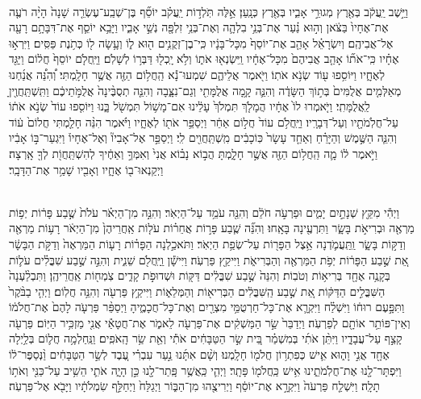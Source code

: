 \documentclass[twoside, openany, parskip=half, 11pt]{book}
\begin{document}
\begin{footnotesize}
\begin{multicols}{2}
\\
 וַיֵּ֣שֶׁב יַֽעֲקֹ֔ב בְּאֶ֖רֶץ מְגוּרֵ֣י אָבִ֑יו בְּאֶ֖רֶץ כְּנָֽעַן׃ אֵ֣לֶּה תֹּֽלְד֣וֹת יַֽעֲקֹ֗ב יוֹסֵ֞ף בֶּן־שְׁבַֽע־עֶשְׂרֵ֤ה שָׁנָה֙ הָיָ֨ה רֹעֶ֤ה אֶת־אֶחָיו֙ בַּצֹּ֔אן וְה֣וּא נַ֗עַר אֶת־בְּנֵ֥י בִלְהָ֛ה וְאֶת־בְּנֵ֥י זִלְפָּ֖ה נְשֵׁ֣י אָבִ֑יו וַיָּבֵ֥א יוֹסֵ֛ף אֶת־דִּבָּתָ֥ם רָעָ֖ה אֶל־אֲבִיהֶֽם׃ וְיִשְׂרָאֵ֗ל אָהַ֤ב אֶת־יוֹסֵף֙ מִכָּל־בָּנָ֔יו כִּֽי־בֶן־זְקֻנִ֥ים ה֖וּא ל֑וֹ וְעָ֥שָׂה ל֖וֹ כְּתֹ֥נֶת פַּסִּֽים׃  וַיִּרְא֣וּ אֶחָ֗יו כִּֽי־אֹת֞וֹ אָהַ֤ב אֲבִיהֶם֙ מִכָּל־אֶחָ֔יו וַֽיִּשְׂנְא֖וּ אֹת֑וֹ וְלֹ֥א יָֽכְל֖וּ דַּבְּר֥וֹ לְשָׁלֹֽם׃ וַיַּֽחֲלֹ֤ם יוֹסֵף֙ חֲל֔וֹם וַיַּגֵּ֖ד לְאֶחָ֑יו וַיּוֹסִ֥פוּ ע֖וֹד שְׂנֹ֥א אֹתֽוֹ׃ וַיֹּ֖אמֶר אֲלֵיהֶ֑ם שִׁמְעוּ־נָ֕א הַֽחֲל֥וֹם הַזֶּ֖ה אֲשֶׁ֥ר חָלָֽמְתִּי׃ וְ֠הִנֵּ֠ה אֲנַ֜חְנוּ מְאַלְּמִ֤ים אֲלֻמִּים֙ בְּת֣וֹךְ הַשָּׂדֶ֔ה וְהִנֵּ֛ה קָ֥מָה אֲלֻמָּתִ֖י וְגַם־נִצָּ֑בָה וְהִנֵּ֤ה תְסֻבֶּ֨ינָה֙ אֲלֻמֹּ֣תֵיכֶ֔ם וַתִּֽשְׁתַּֽחֲוֶ֖יןָ לַֽאֲלֻמָּתִֽי׃  וַיֹּ֤אמְרוּ לוֹ֙ אֶחָ֔יו הֲמָלֹ֤ךְ תִּמְלֹךְ֙ עָלֵ֔ינוּ אִם־מָשׁ֥וֹל תִּמְשֹׁ֖ל בָּ֑נוּ וַיּוֹסִ֤פוּ עוֹד֙ שְׂנֹ֣א אֹת֔וֹ עַל־חֲלֹֽמֹתָ֖יו וְעַל־דְּבָרָֽיו׃ וַיַּֽחֲלֹ֥ם עוֹד֙ חֲל֣וֹם אַחֵ֔ר וַיְסַפֵּ֥ר אֹת֖וֹ לְאֶחָ֑יו וַיֹּ֗אמֶר הִנֵּ֨ה חָלַ֤מְתִּי חֲלוֹם֙ ע֔וֹד וְהִנֵּ֧ה הַשֶּׁ֣מֶשׁ וְהַיָּרֵ֗חַ וְאַחַ֤ד עָשָׂר֙ כּֽוֹכָבִ֔ים מִֽשְׁתַּֽחֲוִ֖ים לִֽי׃ וַיְסַפֵּ֣ר אֶל־אָבִיו֘ וְאֶל־אֶחָיו֒ וַיִּגְעַר־בּ֣וֹ אָבִ֔יו וַיֹּ֣אמֶר ל֔וֹ מָ֛ה הַֽחֲל֥וֹם הַזֶּ֖ה אֲשֶׁ֣ר חָלָ֑מְתָּ הֲב֣וֹא נָב֗וֹא אֲנִי֙ וְאִמְּךָ֣ וְאַחֶ֔יךָ לְהִשְׁתַּֽחֲוֹ֖ת לְךָ֖ אָֽרְצָה׃ וַיְקַנְאוּ־ב֖וֹ אֶחָ֑יו וְאָבִ֖יו שָׁמַ֥ר אֶת־הַדָּבָֽר׃

\\
 וַיְהִ֕י מִקֵּ֖ץ שְׁנָתַ֣יִם יָמִ֑ים וּפַרְעֹ֣ה חֹלֵ֔ם וְהִנֵּ֖ה עֹמֵ֥ד עַל־הַיְאֹֽר׃ וְהִנֵּ֣ה מִן־הַיְאֹ֗ר עֹלֹת֙ שֶׁ֣בַע פָּר֔וֹת יְפ֥וֹת מַרְאֶ֖ה וּבְרִיאֹ֣ת בָּשָׂ֑ר וַתִּרְעֶ֖ינָה בָּאָֽחוּ׃ וְהִנֵּ֞ה שֶׁ֧בַע פָּר֣וֹת אֲחֵר֗וֹת עֹל֤וֹת אַֽחֲרֵיהֶן֙ מִן־הַיְאֹ֔ר רָע֥וֹת מַרְאֶ֖ה וְדַקּ֣וֹת בָּשָׂ֑ר וַֽתַּֽעֲמֹ֛דְנָה אֵ֥צֶל הַפָּר֖וֹת עַל־שְׂפַ֥ת הַיְאֹֽר׃ וַתֹּאכַ֣לְנָה הַפָּר֗וֹת רָע֤וֹת הַמַּרְאֶה֙ וְדַקֹּ֣ת הַבָּשָׂ֔ר אֵ֚ת שֶׁ֣בַע הַפָּר֔וֹת יְפֹ֥ת הַמַּרְאֶ֖ה וְהַבְּרִיאֹ֑ת וַיִּיקַ֖ץ פַּרְעֹֽה׃  וַיִּישָׁ֕ן וַֽיַּֽחֲלֹ֖ם שֵׁנִ֑ית וְהִנֵּ֣ה שֶׁ֣בַע שִׁבֳּלִ֗ים עֹל֛וֹת בְּקָנֶ֥ה אֶחָ֖ד בְּרִיא֥וֹת וְטֹבֽוֹת׃ וְהִנֵּה֙ שֶׁ֣בַע שִׁבֳּלִ֔ים דַּקּ֖וֹת וּשְׁדוּפֹ֣ת קָדִ֑ים צֹֽמְח֖וֹת אַֽחֲרֵיהֶֽן׃ וַתִּבְלַ֨עְנָה֙ הַשִּׁבֳּלִ֣ים הַדַּקּ֔וֹת אֵ֚ת שֶׁ֣בַע הַֽשִּׁבֳּלִ֔ים הַבְּרִיא֖וֹת וְהַמְּלֵא֑וֹת וַיִּיקַ֥ץ פַּרְעֹ֖ה וְהִנֵּ֥ה חֲלֽוֹם׃  וַיְהִ֤י בַבֹּ֨קֶר֙ וַתִּפָּ֣עֶם רוּח֔וֹ וַיִּשְׁלַ֗ח וַיִּקְרָ֛א אֶת־כָּל־חַרְטֻמֵּ֥י מִצְרַ֖יִם וְאֶת־כָּל־חֲכָמֶ֑יהָ וַיְסַפֵּ֨ר פַּרְעֹ֤ה לָהֶם֙ אֶת־חֲלֹמ֔וֹ וְאֵין־פּוֹתֵ֥ר אוֹתָ֖ם לְפַרְעֹֽה׃ וַיְדַבֵּר֙ שַׂ֣ר הַמַּשְׁקִ֔ים אֶת־פַּרְעֹ֖ה לֵאמֹ֑ר אֶת־חֲטָאַ֕י אֲנִ֖י מַזְכִּ֥יר הַיּֽוֹם׃ פַּרְעֹ֖ה קָצַ֣ף עַל־עֲבָדָ֑יו וַיִּתֵּ֨ן אֹתִ֜י בְּמִשְׁמַ֗ר בֵּ֚ית שַׂ֣ר הַטַּבָּחִ֔ים אֹתִ֕י וְאֵ֖ת שַׂ֥ר הָֽאֹפִֽים׃ וַנַּֽחַלְמָ֥ה חֲל֛וֹם בְּלַ֥יְלָה אֶחָ֖ד אֲנִ֣י וָה֑וּא אִ֛ישׁ כְּפִתְר֥וֹן חֲלֹמ֖וֹ חָלָֽמְנוּ׃ וְשָׁ֨ם אִתָּ֜נוּ נַ֣עַר עִבְרִ֗י עֶ֚בֶד לְשַׂ֣ר הַטַּבָּחִ֔ים וַ֨נְּסַפֶּר־ל֔וֹ וַיִּפְתָּר־לָ֖נוּ אֶת־חֲלֹֽמֹתֵ֑ינוּ אִ֥ישׁ כַּֽחֲלֹמ֖וֹ פָּתָֽר׃ וַיְהִ֛י כַּֽאֲשֶׁ֥ר פָּֽתַר־לָ֖נוּ כֵּ֣ן הָיָ֑ה אֹתִ֛י הֵשִׁ֥יב עַל־כַּנִּ֖י וְאֹת֥וֹ תָלָֽה׃ וַיִּשְׁלַ֤ח פַּרְעֹה֙ וַיִּקְרָ֣א אֶת־יוֹסֵ֔ף וַיְרִיצֻ֖הוּ מִן־הַבּ֑וֹר וַיְגַלַּח֙ וַיְחַלֵּ֣ף שִׂמְלֹתָ֔יו וַיָּבֹ֖א אֶל־פַּרְעֹֽה׃


\end{multicols}
\end{footnotesize}
\end{document}
